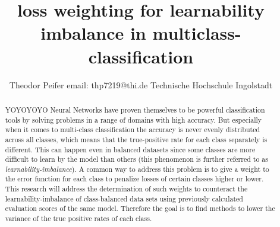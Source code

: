 \documentclass[journal]{IEEEtran}
\begin{document}
\title{\textbf{loss weighting for learnability imbalance in multiclass-classification}}



\author{Theodor Peifer
        \linebreak
        email: thp7219@thi.de
        \linebreak
        Technische Hochschule Ingolstadt
}



\maketitle


\begin{abstract}
YOYOYOYO
Neural Networks have proven themselves to be powerful classification 
tools by solving problems in a range of domains with high accuracy. 
But especially when it comes to multi-class classification the accuracy is never evenly distributed across all classes, which means that the true-positive rate for each class separately is different.
This can happen even in balanced datasets since some classes are more difficult to learn by the model than others (this phenomenon is further referred to as \emph{learnability-imbalance}).
A common way to address this problem is to give a weight to the error function for each class to penalize losses of certain classes higher or lower.
This research will address the determination of such weights to counteract the learnability-imbalance of class-balanced data sets using previously calculated evaluation scores of the same model.
Therefore the goal is to find methods to lower the variance of the true positive rates of each class.
\end{abstract}
\end{document}
